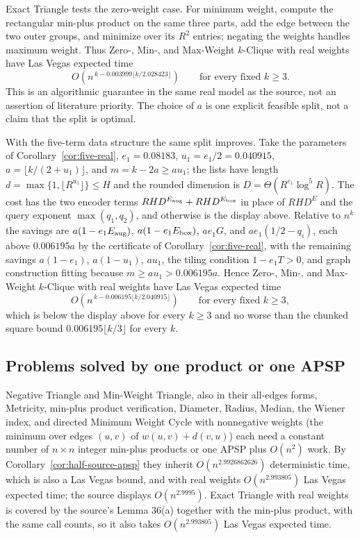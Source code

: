 \documentclass[11pt]{article}
\begin{document}
Exact Triangle tests the zero-weight case. For minimum weight, compute
the rectangular min-plus product on the same three parts, add the edge
between the two outer groups, and minimize over its $R^2$ entries;
negating the weights handles maximum weight. Thus Zero-, Min-, and
Max-Weight $k$-Clique with real weights have Las Vegas expected time
\[
O\!\left(n^{\,k-0.003999\lfloor k/2.028423\rfloor}\right)
\qquad\text{for every fixed }k\ge3.
\]
This is an algorithmic guarantee in the same real model as the source,
not an assertion of literature priority. The choice of $a$ is one
explicit feasible split, not a claim that the split is optimal.

With the five-term data structure the same split improves. Take the
parameters of Corollary~\ref{cor:five-real},
$e_1=0.08183$, $u_1=e_1/2=0.040915$, $a=\lfloor k/(2+u_1)\rfloor$, and
$m=k-2a\ge au_1$; the lists have length $d=\max\{1,\lfloor R^{u_1}\rfloor\}
\le H$ and the rounded dimension is $D=\Theta(R^{e_1}\log^5R)$. The cost
has the two encoder terms $RHD^{E_{\rm aug}}+RHD^{E_{\rm box}}$ in place of
$RHD^E$ and the query exponent $\max(q_1,q_2)$, and otherwise is the
display above. Relative to $n^k$ the savings are $a(1-e_1E_{\rm aug})$,
$a(1-e_1E_{\rm box})$, $ae_1G$, and $ae_1(1/2-q_i)$, each above
$0.006195a$ by the certificate of Corollary~\ref{cor:five-real}, with the
remaining savings $a(1-e_1)$, $a(1-u_1)$, $au_1$, the tiling condition
$1-e_1T>0$, and graph construction fitting because
$m\ge au_1>0.006195a$. Hence Zero-, Min-, and Max-Weight $k$-Clique with
real weights have Las Vegas expected time
\[
O\!\left(n^{\,k-0.006195\lfloor k/2.040915\rfloor}\right)
\qquad\text{for every fixed }k\ge3,
\]
which is below the display above for every $k\ge3$ and no worse than the chunked
square bound $0.006195\lfloor k/3\rfloor$ for every $k$.

\subsection*{Problems solved by one product or one APSP}
Negative Triangle and Min-Weight Triangle, also in their all-edges forms,
Metricity, min-plus product verification, Diameter, Radius, Median, the
Wiener index, and directed Minimum Weight Cycle with nonnegative weights
(the minimum over edges $(u,v)$ of $w(u,v)+d(v,u)$) each need a constant
number of $n\times n$ integer min-plus products or one APSP plus $O(n^2)$
work. By Corollary~\ref{cor:half-source-apsp} they inherit
$O(n^{2.9926862626})$ deterministic time, which is also a
Las Vegas bound, and with real weights $O(n^{2.993805})$ Las Vegas
expected time; the source displays $O(n^{2.9995})$. Exact Triangle with real
weights is covered by the source's Lemma 36(a) together with the min-plus
product, with the same call counts, so it also takes $O(n^{2.993805})$ Las
Vegas expected time.
\end{document}
